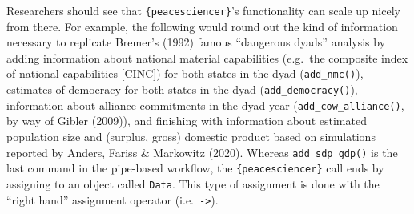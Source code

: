 \documentclass[
  11pt,
]{article}
\begin{document}
Researchers should see that \texttt{\{peacesciencer\}}'s functionality can scale up nicely from there. For example, the following would round out the kind of information necessary to replicate Bremer's (1992) famous ``dangerous dyads'' analysis by adding information about national material capabilities (e.g.~the composite index of national capabilities {[}CINC{]}) for both states in the dyad (\texttt{add\_nmc()}), estimates of democracy for both states in the dyad (\texttt{add\_democracy()}), information about alliance commitments in the dyad-year (\texttt{add\_cow\_alliance()}, by way of Gibler (2009)), and finishing with information about estimated population size and (surplus, gross) domestic product based on simulations reported by Anders, Fariss \& Markowitz (2020). Whereas \texttt{add\_sdp\_gdp()} is the last command in the pipe-based workflow, the \texttt{\{peacesciencer\}} call ends by assigning to an object called \texttt{Data}. This type of assignment is done with the ``right hand'' assignment operator (i.e.~\texttt{-\textgreater{}}).
\end{document}
